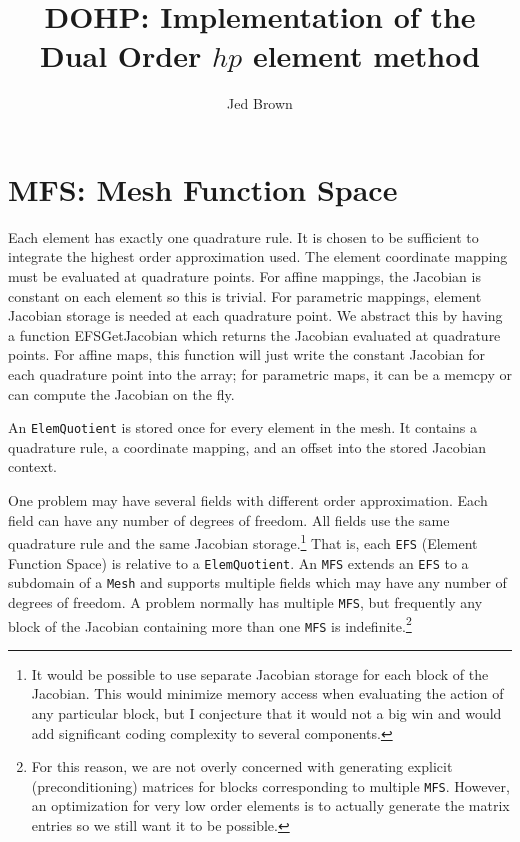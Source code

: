 \documentclass[a4paper]{article}
\title{DOHP: Implementation of the Dual Order $hp$ element method}
\author{Jed Brown}
\newcommand{\struct}[1]{\texttt{#1}}
\newcommand{\trl}[1]{\texttt{#1}}
\begin{document}
\maketitle

\section{MFS: Mesh Function Space}
Each element has exactly one quadrature rule.  It is chosen to be sufficient to
integrate the highest order approximation used.  The element coordinate mapping
must be evaluated at quadrature points.  For affine mappings, the Jacobian is
constant on each element so this is trivial.  For parametric mappings, element
Jacobian storage is needed at each quadrature point.  We abstract this by having
a function EFSGetJacobian which returns the Jacobian evaluated at quadrature
points.  For affine maps, this function will just write the constant Jacobian
for each quadrature point into the array; for parametric maps, it can be a
memcpy or can compute the Jacobian on the fly.

An \struct{ElemQuotient} is stored once for every element in the mesh. It
contains a quadrature rule, a coordinate mapping, and an offset into the stored
Jacobian context.

One problem may have several fields with different order approximation.  Each
field can have any number of degrees of freedom.  All fields use the same
quadrature rule and the same Jacobian storage.\footnote{It would be possible to
  use separate Jacobian storage for each block of the Jacobian.  This would
  minimize memory access when evaluating the action of any particular block, but
  I conjecture that it would not a big win and would add significant coding
  complexity to several components.}  That is, each \trl{EFS} (Element Function
Space) is relative to a \struct{ElemQuotient}.  An \trl{MFS} extends an
\trl{EFS} to a subdomain of a \trl{Mesh} and supports multiple fields which may
have any number of degrees of freedom.  A problem normally has multiple
\trl{MFS}, but frequently any block of the Jacobian containing more than one
\trl{MFS} is indefinite.\footnote{For this reason, we are not overly concerned
  with generating explicit (preconditioning) matrices for blocks corresponding
  to multiple \trl{MFS}.  However, an optimization for very low order elements
  is to actually generate the matrix entries so we still want it to be
  possible.}
\end{document}
